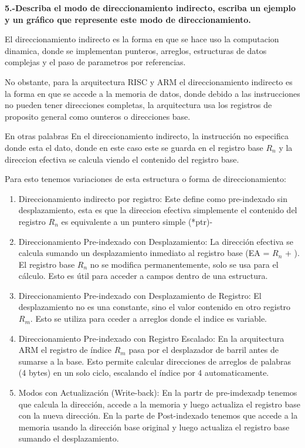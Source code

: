 \documentclass[letterpaper,12pt]{article}
\begin{document}
    \newpage
    
    \noindent\textbf{5.-Describa el modo de direccionamiento indirecto, escriba un ejemplo y un gráfico que represente este modo de direccionamiento.}

    El direccionamiento indirecto es la forma en que se hace uso la computacion dinamica, donde se implementan punteros, arreglos, estructuras de datos complejas y el paso de parametros por referencias.
    
    No obstante, para la arquitectura RISC y ARM el direccionamiento indirecto es la forma en que se accede a la memoria de datos, donde debido a las instrucciones no pueden tener direcciones completas, la arquitectura usa los registros de proposito general como ounteros o direcciones base.

    En otras palabras En el direccionamiento indirecto, la instrucción no especifica donde esta el dato, donde en este caso este se guarda en el registro base $R_n$ y la direccion efectiva se calcula viendo el contenido del registro base.

    Para esto tenemos variaciones de esta estructura o forma de direccionamiento:

    \begin{enumerate}
        \item Direccionamiento indirecto por registro: Este define como pre-indexado sin desplazamiento, esta es que la direccion efectiva simplemente el contenido del registro $R_n$ es equivalente a un puntero simple (*ptr)-
        \item Direccionamiento Pre-indexado con Desplazamiento: La dirección efectiva se calcula sumando un desplazamiento inmediato al registro base (EA = $R_n$ + ). El registro base $R_n$ no se modifica permanentemente, solo se usa para el cálculo. Esto es útil para acceder a campos dentro de una estructura.
        \item Direccionamiento Pre-indexado con Desplazamiento de Registro: El desplazamiento no es una constante, sino el valor contenido en otro registro $R_m$. Esto se utiliza para cceder a arreglos donde el indice es variable.
        \item Direccionamiento Pre-indexado con Registro Escalado: En la arquitectura ARM el registro de índice $R_m$ pasa por el desplazador de barril antes de sumarse a la base. Esto permite calcular direcciones de arreglos de palabras (4 bytes) en un solo ciclo, escalando el índice por 4 automaticamente.
        \item Modos con Actualización (Write-back): En la partr de pre-imdexadp tenemos que calcula la dirección, accede a la memoria y luego actualiza el registro base con la nueva dirección. En la parte de Post-indexado tenemos que accede a la memoria usando la dirección base original y luego actualiza el registro base sumando el desplazamiento.

    \end{enumerate}
\end{document}
